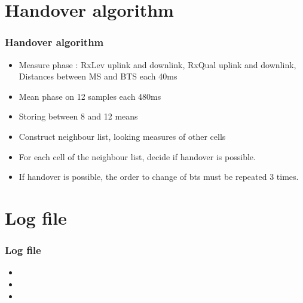 \documentclass{beamer}
\begin{document}
\section{Handover algorithm}

\begin{frame}
\frametitle{Handover algorithm}
\begin{itemize}
  \item Measure phase : RxLev uplink and downlink, RxQual uplink and downlink, Distances between MS and BTS each 40ms
  \item Mean phase on 12 samples each 480ms
  \item Storing between 8 and 12 means
  \item Construct neighbour list, looking measures of other cells
  \item For each cell of the neighbour list, decide if handover is possible.
  \item If handover is possible, the order to change of bts must be repeated 3
times.

\end{itemize}
\end{frame}
\section{Log file}
\begin{frame}
\frametitle{Log file}
\begin{itemize}
 \item 
 \item 
 \item 
\end{itemize}
\end{frame}
\end{document}
